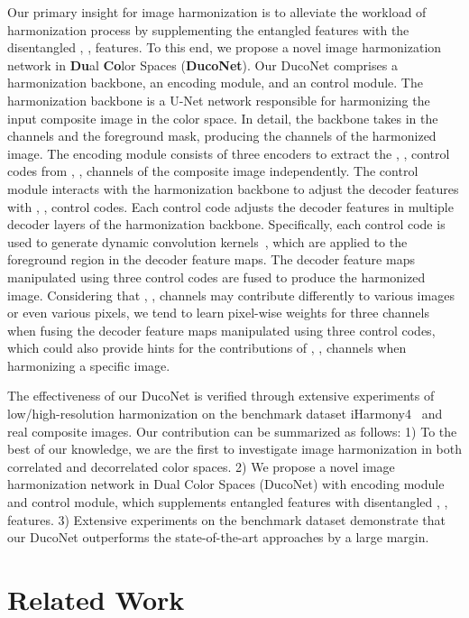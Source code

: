 \documentclass[sigconf]{acmart}
\begin{document}
Our primary insight for image harmonization is to alleviate the workload of harmonization process by supplementing the entangled  features with the disentangled , ,  features. 
To this end, we propose a novel image harmonization network in \textbf{Du}al \textbf{Co}lor Spaces (\textbf{DucoNet}). 
Our DucoNet comprises a  harmonization backbone, an  encoding module, and an  control module. 
The harmonization backbone is a U-Net network responsible for harmonizing the input composite image in the  color space. In detail, the backbone takes in the  channels and the foreground mask, producing the  channels of the harmonized image. 
The  encoding module consists of three encoders to extract the , ,  control codes from , ,  channels of the composite image independently. 
The  control module interacts with the harmonization backbone to adjust the decoder features with , ,  control codes. 
Each control code adjusts the decoder features in multiple decoder layers of the harmonization backbone. Specifically, each control code is used to generate dynamic convolution kernels~\cite{styleganv2}, which are applied to the foreground region in the decoder feature maps. The decoder feature maps manipulated using three control codes are fused to produce the harmonized image. 
Considering that , ,  channels may contribute differently to various images or even various pixels, we tend to learn pixel-wise weights for three channels when fusing the decoder feature maps manipulated using three control codes, which could also provide hints for the contributions of , ,  channels when harmonizing a specific image. 

The effectiveness of our DucoNet is verified through extensive experiments of low/high-resolution harmonization on the benchmark dataset iHarmony4~\cite{dovenet} and real composite images.
Our contribution can be summarized as follows: 1) To the best of our knowledge, we are the first to investigate image harmonization in both correlated and decorrelated color spaces. 2) We propose a novel image harmonization network in Dual Color Spaces (DucoNet) with   encoding module and control module, which supplements entangled  features with disentangled , ,  features. 3) Extensive experiments on the benchmark dataset demonstrate that our DucoNet outperforms the state-of-the-art approaches by a large margin.


\section{Related Work}
\end{document}
